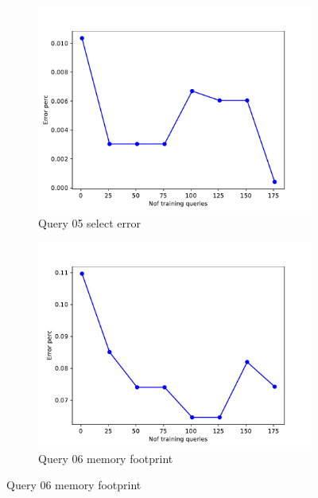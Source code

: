 \begin{figure}[!htb]
    \begin{subfigure}[t]{0.5\textwidth}
      \includegraphics[scale=0.4]{figs/tpch10/tpch10_sel05_error.pdf}
      \caption{Query 05 select error}
      \label{fig:tpch_sel05}
    \end{subfigure}
    \begin{subfigure}[t]{0.5\textwidth}
      \includegraphics[scale=0.4]{figs/tpch10/tpch10_sel06_error.pdf}
      \caption{Query 06 memory footprint}
      \label{fig:tpch_sel06}
     \end{subfigure}


\end{figure}

